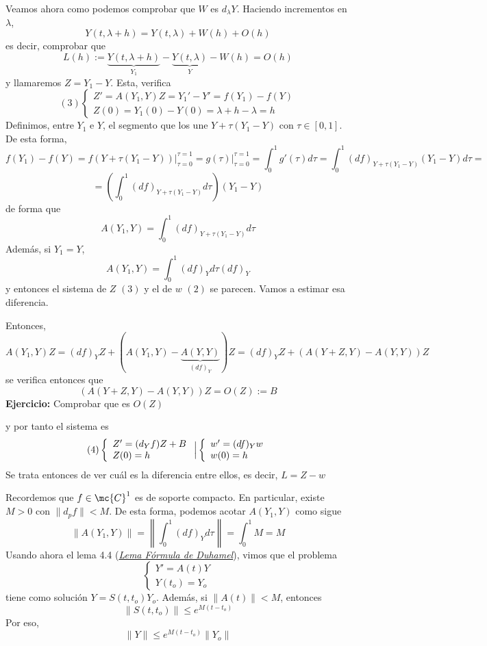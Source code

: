 \begin{dem}
Veamos ahora como podemos comprobar que $W$ es $d_{\lambda}Y$. Haciendo incrementos en $\lambda$, 
$$Y(t, \lambda + h)=Y(t,\lambda) + W(h) + O(h)$$
es decir, comprobar que 
$$L(h):= \underbrace{Y(t, \lambda + h)}_{Y_1} - \underbrace{Y(t,\lambda)}_Y - W(h) = O(h)$$
y llamaremos $Z=Y_1-Y$. Esta, verifica
$$(3) \left\{ \begin{array}{l}
     Z'=A(Y_1,Y)Z=Y_1'-Y'=f(Y_1)-f(Y)  \\
     Z(0)=Y_1(0)-Y(0)=\lambda+h - \lambda = h
\end{array} 
\right.$$
Definimos, entre $Y_1$ e $Y$, el segmento que los une $Y+\tau(Y_1-Y)$ con $\tau\in [0,1]$. De esta forma, 
$$f(Y_1)-f(Y)=f(Y+\tau(Y_1-Y))\Big|_{\tau=0}^{\tau=1}=g(\tau) \Big|_{\tau=0}^{\tau=1} = \int_0^1 g'(\tau) d\tau = \int_0^1 (df)_{Y+\tau(Y_1-Y)} (Y_1-Y) d\tau =$$
$$=\left(\int_0^1 (df)_{Y+\tau(Y_1-Y)} d\tau \right)(Y_1-Y) $$
de forma que 
$$A(Y_1,Y)=\int_0^1 (df)_{Y+\tau(Y_1-Y)} d\tau$$
Además, si $Y_1=Y$, 
$$A(Y_1,Y)=\int_0^1 (df)_{Y} d\tau (df)_Y$$
y entonces el sistema de $Z$ $(3)$ y el de $w$ $(2)$ se parecen. Vamos a estimar esa diferencia.

Entonces,
$$A(Y_1,Y)Z=(df)_YZ+(A(Y_1,Y)-\underbrace{A(Y,Y)}_{(df)_Y})Z = (df)_YZ+(A(Y+Z,Y)-A(Y,Y))Z$$
se verifica entonces que
$$(A(Y+Z,Y)-A(Y,Y))Z=O(Z):=B$$
\textbf{Ejercicio:} Comprobar que es $O(Z)$

y por tanto el sistema es
$$(4) \left\{ \begin{array}{l}
     Z'=(d_Yf)Z+B  \\
     Z(0)= h
\end{array} 
\right. \Big{|} \left\{ \begin{array}{l}
     w'=(df)_{Y} w  \\
     w(0)=h
\end{array} 
\right.$$
Se trata entonces de ver cuál es la diferencia entre ellos, es decir, $L=Z-w$


Recordemos que $f \in \mc{C}^1$ es de soporte compacto. En particular, existe $M>0$ con $\|d_pf\|<M$. De esta forma, podemos acotar $A(Y_1,Y)$ como sigue
$$\|A(Y_1,Y)\|=\left\| \int_0^1 (df)_{Y} d\tau \right\| = \int_0^1 M = M$$
Usando ahora el lema 4.4 (\hyperref[lema4.4]{\textit{Lema Fórmula de Duhamel}}), vimos que el problema
$$\left\{ \begin{array}{l}
     Y'=A(t)Y  \\
     Y(t_o)=Y_o
\end{array} 
\right.$$
tiene como solución $Y=S(t,t_o)Y_o$. Además, si $\|A(t)\|<M$, entonces 
$$\|S(t,t_o)\|\leq e^{M(t-t_o)}$$
Por eso, 
$$\|Y\|\leq e^{M(t-t_o)}\|Y_o\|$$


\end{dem}

